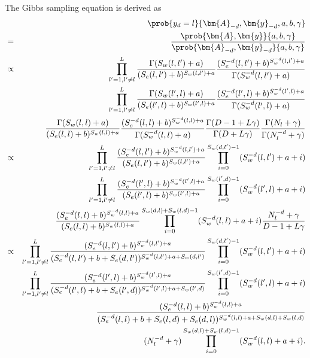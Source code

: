 The Gibbs sampling equation is derived as
\begin{eqnarray}
&&\prob {y_{d}=l} {\bm{A}_{-d}, \bm{y}_{-d}, a, b, \gamma} \\
&=& \frac {\prob {\bm{A}, \bm{y}} {a, b, \gamma}} {\prob {\bm{A}_{-d}, \bm{y}_{-d}} {a, b, \gamma}}\\
&\propto& \prod_{l'=1, l'\neq l}^L \frac {\Gamma(S_w (l,l')+a)} {(S_e (l,l')+b)^{S_w (l,l')+a}} \frac {(S_e^{-d} (l,l')+b)^{S_w^{-d} (l,l')+a}} {\Gamma(S_w^{-d} (l,l')+a)} \notag\\
&& \prod_{l'=1, l'\neq l}^L \frac {\Gamma(S_w (l',l)+a)} {(S_e (l',l)+b)^{S_w (l',l)+a}} \frac {(S_e^{-d} (l',l)+b)^{S_w^{-d} (l',l)+a}} {\Gamma(S_w^{-d} (l',l)+a)} \notag\\
&& \frac {\Gamma(S_w (l,l)+a)} {(S_e (l,l)+b)^{S_w (l,l)+a}} \frac {(S_e^{-d} (l,l)+b)^{S_w^{-d} (l,l)+a}} {\Gamma(S_w^{-d} (l,l)+a)} \frac {\Gamma(D-1+L\gamma)} {\Gamma(D+L\gamma)} \frac {\Gamma(N_l+\gamma)} {\Gamma(N_l^{-d}+\gamma)} \\
&\propto& \prod_{l'=1, l'\neq l}^L \frac {(S_e^{-d} (l,l')+b)^{S_w^{-d} (l,l')+a}} {(S_e (l,l')+b)^{S_w (l,l')+a}} \prod_{i=0}^{S_w(d,l')-1} (S_w^{-d}(l,l')+a+i) \notag\\
&& \prod_{l'=1, l'\neq l}^L \frac {(S_e^{-d} (l',l)+b)^{S_w^{-d} (l',l)+a}} {(S_e (l',l)+b)^{S_w (l',l)+a}} \prod_{i=0}^{S_w(l',d)-1} (S_w^{-d}(l',l)+a+i) \notag\\
&& \frac {(S_e^{-d} (l,l)+b)^{S_w^{-d} (l,l)+a}} {(S_e (l,l)+b)^{S_w (l,l)+a}} \prod_{i=0}^{S_w(d,l)+S_w(l,d)-1} (S_w^{-d}(l,l)+a+i)\frac {N_l^{-d}+\gamma} {D-1+L\gamma}\\
&\propto& \prod_{l'=1, l'\neq l}^L \frac {(S_e^{-d} (l,l')+b)^{S_w^{-d} (l,l')+a}} {(S_e^{-d} (l,l')+b+ S_e(d,l'))^{S_w^{-d} (l,l')+a+ S_w(d,l')}} \prod_{i=0}^{S_w(d,l')-1} (S_w^{-d}(l,l')+a+i) \notag\\
&& \prod_{l'=1, l'\neq l}^L \frac {(S_e^{-d} (l',l)+b)^{S_w^{-d} (l',l)+a}} {(S_e^{-d} (l',l)+b+ S_e(l',d))^{S_w^{-d} (l',l)+a+ S_w(l',d)}} \prod_{i=0}^{S_w(l',d)-1} (S_w^{-d}(l',l)+a+i) \notag\\
&& \frac {(S_e^{-d} (l,l)+b)^{S_w^{-d} (l,l)+a}} {(S_e^{-d} (l,l)+b+ S_e(l,d) +S_e(d,l))^{S_w^{-d} (l,l)+a+ S_w(d,l)+ S_w(l,d)}} \notag\\
&& (N_l^{-d}+\gamma) \prod_{i=0}^{S_w(d,l)+S_w(l,d)-1} (S_w^{-d}(l,l)+a+i).
\end{eqnarray} 